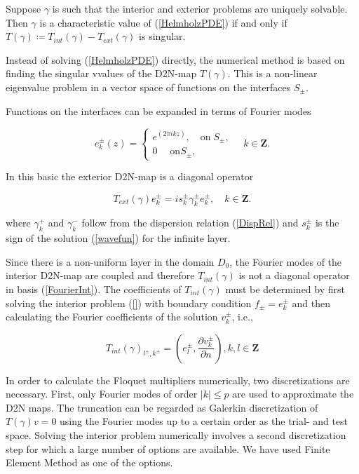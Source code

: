 Suppose $\gamma$ is such that the interior and exterior problems are
uniquely solvable. Then $\gamma$ is a characteristic value of
(\ref{HelmholzPDE}) if and only if $T(\gamma) \coloneqq
T_{int}(\gamma)- T_{ext}(\gamma)$ is singular.

Instead of solving (\ref{HelmholzPDE}) directly, the numerical method
is based on finding the singular vvalues of the D2N-map
$T(\gamma)$. This is a non-linear eigenvalue problem in a vector space
of functions on the interfaces $S_\pm$.

Functions on the interfaces can be expanded in terms of Fourier modes

\begin{equation}
e_k^\pm (z) = \left \{ \begin{array} {ll}
e^{(2 \pi i k z)}, \quad \textrm{on} \; S_\pm, \\
0 \quad \; \textrm{on} S_\pm, \end{array} \right .
\quad k \in \mathbf{Z}.
\label{FourierInt}
\end{equation}

In this basic the exterior D2N-map is a diagonal operator

\begin{equation}
T_{ext}(\gamma) e_k^\pm = i s_k^\pm \gamma_k^\pm e_k^\pm,
\quad k \in \mathbf{Z}.
\end{equation}

where $\gamma_k^+$ and $\gamma_k^-$ follow from the dispersion
relation (\ref{DispRel}) and $s_k^\pm$ is the sign of the solution
(\ref{wavefun}) for the infinite layer.

Since there is a non-uniform layer in the domain $D_0$, the Fourier
modes of the interior D2N-map are coupled and therefore
$T_{int}(\gamma)$ is not a diagonal operator in basis
(\ref{FourierInt}). The coefficients of $T_{int}(\gamma)$ must be
determined by first solving the interior problem (\ref{}) with
boundary condition $f_\pm = e_k^\pm$ and then calculating the Fourier
coefficients of the solution $v_k^\pm$, i.e.,

\begin{equation}
T_{int}(\gamma)_{l^\pm,k^\pm} = (e_l^\pm, \frac{\partial{v_k^\pm}}
{\partial{n}}), k,l \in \mathbf{Z}
\end{equation}

In order to calculate the Floquet multipliers numerically, two
discretizations are necessary. First, only Fourier modes of order $|k|
\leq p$ are used to approximate the D2N maps. The truncation can be
regarded as Galerkin discretization of $T(\gamma)v = 0$ using the
Fourier modes up to a certain order as the trial- and test
space. Solving the interior problem numerically involves a second
discretization step for which a large number of options are available.
We have used Finite Element Method as one of the options.

